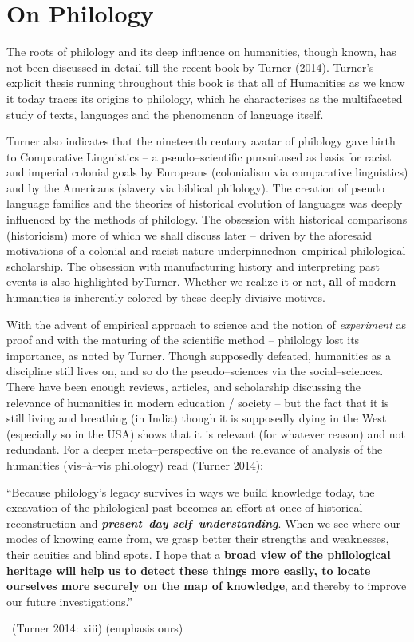 \section*{On Philology}

The roots of philology and its deep influence on humanities, though known, has not been discussed in detail till the recent book by Turner (2014). Turner’s explicit thesis running throughout this book is that all of Humanities as we know it today traces its origins to philology, which he characterises as the multifaceted study of texts, languages and the phenomenon of language itself.

Turner also indicates that the nineteenth century avatar of philology gave birth to Comparative Linguistics – a pseudo–scientific pursuit\break used as basis for racist and imperial colonial goals by Europeans (colonialism via comparative linguistics) and by the Americans (slavery via biblical philology). The creation of pseudo language families and the theories of historical evolution of languages was deeply influenced by the methods of philology. The obsession with historical comparisons (historicism) more of which we shall discuss later – driven by the aforesaid motivations of a colonial and racist nature underpinned\break non–empirical philological scholarship. The obsession with manufacturing history and interpreting past events is also highlighted by\break Turner. Whether we realize it or not, \textbf{all} of modern humanities is inherently colored by these deeply divisive motives.

With the advent of empirical approach to science and the notion of \textit{experiment} as proof and with the maturing of the scientific method – philology lost its importance, as noted by Turner. Though supposedly defeated, humanities as a discipline still lives on, and so do the pseudo–sciences via the social–sciences. There have been enough reviews, articles, and scholarship discussing the relevance of humanities in modern education / society – but the fact that it is still living and breathing (in India) though it is supposedly dying in the West (especially so in the USA) shows that it is relevant (for whatever reason) and not redundant. For a deeper meta–perspective on the relevance of analysis of the humanities (vis–à–vis philology) read (Turner 2014):

\begin{myquote}
“Because philology’s legacy survives in ways we build knowledge today, the excavation of the philological past becomes an effort at once of historical reconstruction and \textbf{\textit{present–day self–understanding}}. When we see where our modes of knowing came from, we grasp better their strengths and weaknesses, their acuities and blind spots. I hope that a \textbf{broad view of the philological heritage will help us to detect these things more easily, to locate ourselves more securely on the map of knowledge}, and thereby to improve our future investigations.”

~\hfill (Turner 2014: xiii) (emphasis ours)
\end{myquote}


